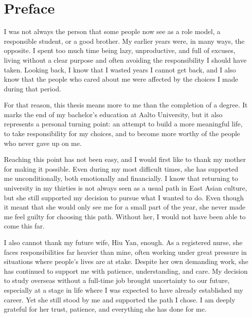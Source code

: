 \documentclass[english,12pt,a4paper,elec,utf8,a-2b,online]{aaltothesis}
\begin{document}

\makecoverpage

\clearpage
\thispagestyle{empty}
\section*{Preface}

I was not always the person that some people now see as a role model, a responsible student, or a good brother. My earlier years were, in many ways, the opposite. I spent too much time being lazy, unproductive, and full of excuses, living without a clear purpose and often avoiding the responsibility I should have taken. Looking back, I know that I wasted years I cannot get back, and I also know that the people who cared about me were affected by the choices I made during that period.

For that reason, this thesis means more to me than the completion of a degree. It marks the end of my bachelor’s education at Aalto University, but it also represents a personal turning point: an attempt to build a more meaningful life, to take responsibility for my choices, and to become more worthy of the people who never gave up on me.

Reaching this point has not been easy, and I would first like to thank my mother for making it possible. Even during my most difficult times, she has supported me unconditionally, both emotionally and financially. I know that returning to university in my thirties is not always seen as a usual path in East Asian culture, but she still supported my decision to pursue what I wanted to do. Even though it meant that she would only see me for a small part of the year, she never made me feel guilty for choosing this path. Without her, I would not have been able to come this far.

I also cannot thank my future wife, Hiu Yan, enough. As a registered nurse, she faces responsibilities far heavier than mine, often working under great pressure in situations where people’s lives are at stake. Despite her own demanding work, she has continued to support me with patience, understanding, and care. My decision to study overseas without a full-time job brought uncertainty to our future, especially at a stage in life where I was expected to have already established my career. Yet she still stood by me and supported the path I chose. I am deeply grateful for her trust, patience, and everything she has done for me.
\end{document}
